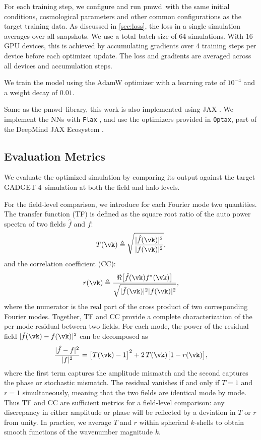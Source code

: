 \documentclass[modern, trackchanges, dvipsnames]{aastex631}
\newcommand{\pmwd}{{\usefont{T1}{nova}{m}{sl}pmwd}}
\newcommand{\GADGET}{{{\fontsize{10pt}{12pt}\selectfont GADGET}-4}}
\begin{document}
For each training step, we configure and run \pmwd\ with the same
initial conditions, cosmological parameters and other common
configurations as the target training data.
As discussed in \autoref{sec:loss}, the loss in a single simulation averages
over all snapshots.
We use a total batch size of 64 simulations.
With 16 GPU devices, this is achieved by accumulating gradients over 4 training
steps per device before each optimizer update.
The loss and gradients are averaged across all devices and accumulation steps.

We train the model using the AdamW \citep{AdamW} optimizer with a learning rate
of $10^{-4}$ and a weight decay of $0.01$.

Same as the \pmwd\ library, this work is also implemented using JAX
\citep{JAX}.
We implement the NNs with \texttt{Flax} \citep{flax2020github}, and use
the optimizers provided in \texttt{Optax}, part of the DeepMind JAX
Ecosystem \citep{deepmind2020jax}.


\vspace{1em}
\subsection{Evaluation Metrics}
\label{sec:metrics}

We evaluate the optimized simulation by comparing its output against the
target \GADGET\ simulation at both the field and halo levels.

For the field-level comparison, we introduce for each Fourier mode two
quantities.
The transfer function (TF) is defined as the square root ratio of the
auto power spectra of two fields $\hat f$ and $f$:
%
\begin{equation}
T(\vk) \triangleq
\sqrt{\frac{|\hat f(\vk)|^2}{|f(\vk)|^2}},
\label{T}
\end{equation}
%
and the correlation coefficient (CC):
%
\begin{equation}
r(\vk) \triangleq
\frac{\Re \bigl[ \hat f(\vk) f^*(\vk) \bigr]}
     {\sqrt{|\hat f(\vk)|^2 |f(\vk)|^2}},
\label{r}
\end{equation}
%
where the numerator is the real part of the cross product of two
corresponding Fourier modes.
Together, TF and CC provide a complete characterization of the
per-mode residual between two fields.
For each mode, the power of the residual field
$|\hat f(\vk) - f(\vk)|^2$ can be decomposed as
%
\begin{equation}
\frac{|\hat f - f|^2}{|f|^2}
= \bigl[T(\vk) - 1\bigr]^2 + 2\,T(\vk)\bigl[1 - r(\vk)\bigr],
\label{residual_decomp}
\end{equation}
%
where the first term captures the amplitude mismatch and the second
captures the phase or stochastic mismatch.
The residual vanishes if and only if $T=1$ and $r=1$ simultaneously,
meaning that the two fields are identical mode by mode.
Thus TF and CC are sufficient metrics for a field-level comparison:
any discrepancy in either amplitude or phase will be reflected by a
deviation in $T$ or $r$ from unity.
In practice, we average $T$ and $r$ within spherical $k$-shells to
obtain smooth functions of the wavenumber magnitude $k$.
\end{document}
